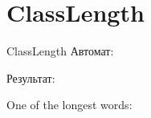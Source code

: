 \section{ClassLength}
\begin{frame}{ClassLength}
	Автомат:


	Результат:

	One of the longest words:


\end{frame}

